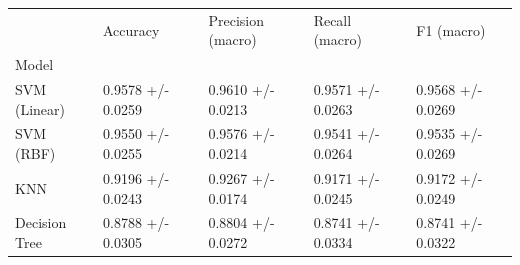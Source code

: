 \begin{tabular}{lllll}
\toprule
 & Accuracy & Precision (macro) & Recall (macro) & F1 (macro) \\
Model &  &  &  &  \\
\midrule
SVM (Linear) & 0.9578 +/- 0.0259 & 0.9610 +/- 0.0213 & 0.9571 +/- 0.0263 & 0.9568 +/- 0.0269 \\
SVM (RBF) & 0.9550 +/- 0.0255 & 0.9576 +/- 0.0214 & 0.9541 +/- 0.0264 & 0.9535 +/- 0.0269 \\
KNN & 0.9196 +/- 0.0243 & 0.9267 +/- 0.0174 & 0.9171 +/- 0.0245 & 0.9172 +/- 0.0249 \\
Decision Tree & 0.8788 +/- 0.0305 & 0.8804 +/- 0.0272 & 0.8741 +/- 0.0334 & 0.8741 +/- 0.0322 \\
\bottomrule
\end{tabular}
